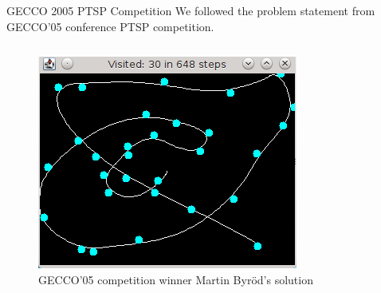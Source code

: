 \documentclass[final,t]{beamer}
\begin{document}
\begin{frame}{}
\begin{columns}[t]
\begin{column}{.305\linewidth}
      \begin{block}{GECCO 2005 PTSP Competition}
        We followed the \alert{problem statement} from GECCO'05 conference PTSP competition. 
        \begin{columns}[T]
          \begin{column}{.53\linewidth} 
            \begin{figure}
              \centering
              \includegraphics[width=\linewidth]{byrod_solution1.png}          
              \caption{\centering GECCO'05 competition winner Martin Byr\"{o}d's solution}
            \end{figure}
          \end{column}


\end{columns}
\end{block}
\end{column}
\end{columns}
\end{frame}
\end{document}
